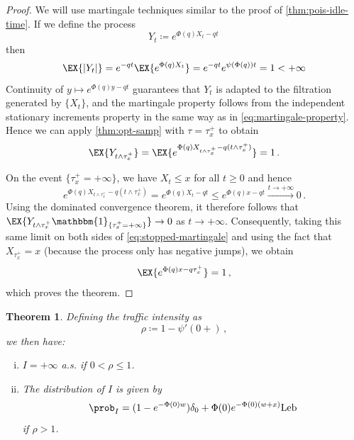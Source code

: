 \documentclass[titlepage]{article}
\theoremstyle{plain}
\newtheorem{theorem}{Theorem}[section]
\theoremstyle{definition}
\begin{document}
\begin{proof} 
  We will use martingale techniques similar to the proof of \cref{thm:pois-idle-time}. If we define the process
  \begin{equation}
    Y_t \coloneqq e^{\Phi(q) X_t - q t} \,
  \end{equation}
  then
  \begin{equation}
    \EX{\vert Y_t \vert} = e^{-q t} \EX{e^{\Phi(q) X_t}} = e^{-q t} e^{\psi(\Phi(q)) t} = 1 < +\infty
  \end{equation}
  Continuity of $y \mapsto e^{\Phi(q)y - q t}$ guarantees that $Y_t$ is adapted to the filtration generated by $\{ X_t \}$, and the martingale property follows from the independent stationary increments property in the same way as in \cref{eq:martingale-property}. Hence we can apply \cref{thm:opt-samp} with $\tau = \tau_x^+$ to obtain
  \begin{equation} \label{eq:stopped-martingale}
    \EX{Y_{t \wedge \tau_x^+}} = \EX{e^{\Phi(q) X_{t \wedge \tau_x^+} - q (t \wedge \tau_x^+)}} = 1 \,.
  \end{equation}

  On the event $\{ \tau_x^+ = +\infty \}$, we have $X_t \leq x$ for all $t \geq 0$ and hence
  \begin{equation}
    e^{\Phi(q) X_{t \wedge \tau_x^+} - q (t \wedge \tau_x^+)} = e^{\Phi(q) X_t - q t} \leq e^{\Phi(q) x - q t} \xrightarrow{t \to +\infty} 0 \,.
  \end{equation}
  Using the dominated convergence theorem, it therefore follows that $\EX{Y_{t \wedge \tau_x^+} \mathbbm{1}_{\{ \tau_x^+ = +\infty \}}} \to 0$ as $t \to +\infty$. Consequently, taking this same limit on both sides of \cref{eq:stopped-martingale} and using the fact that $X_{\tau_x^+} = x$ (because the process only has negative jumps), we obtain
  \begin{equation}
    \EX{e^{\Phi(q) x - q \tau_x^+}} = 1 \,,
  \end{equation}
  which proves the theorem.
\end{proof}

\begin{theorem} \label{thm:gen-idle-time}
  Defining the \emph{traffic intensity} as
  \begin{equation}
    \rho \coloneqq 1 - \psi'(0+) \,,
  \end{equation}
  we then have:
  \begin{enumerate}[(i)]
    \item $I = +\infty$ a.s. if $0 < \rho \leq 1$.
    \item The distribution of $I$ is given by
          \begin{equation}
            \prob_I = (1 - e^{-\Phi(0)w}) \delta_0 + \Phi(0) e^{-\Phi(0)(w + x)} \mathrm{Leb}
          \end{equation}
          if $\rho > 1$.
  \end{enumerate}
\end{theorem}
\end{document}
